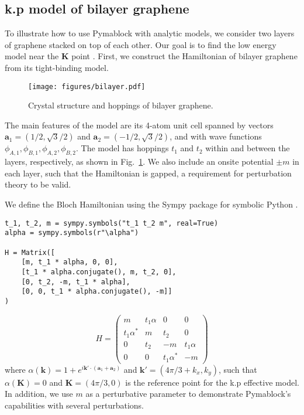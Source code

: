 \subsection{k.p model of bilayer graphene}


To illustrate how to use Pymablock with analytic models, we consider two layers
of graphene stacked on top of each other.
Our goal is to find the low energy model near the $\mathbf{K}$ point
\cite{McCann_2013}.
First, we construct the Hamiltonian of bilayer graphene from its tight-binding
model.
%
\begin{figure}[!htbp]
\centering
\texttt{[image: figures/bilayer.pdf]}
\caption[]{Crystal structure and hoppings of bilayer graphene.}
\label{fig:bilayer}
\end{figure}
%
The main features of the model are its 4-atom unit cell spanned by vectors
$\mathbf{a}_1 = (1/2, \sqrt{3}/2)$ and $\mathbf{a}_2=( -1/2, \sqrt{3}/2)$,
and with wave functions $\phi_{A,1}, \phi_{B,1}, \phi_{A,2}, \phi_{B,2}$.
The model has hoppings $t_1$ and $t_2$ within and between the layers,
respectively, as shown in Fig.~\ref{fig:bilayer}.
We also include an onsite potential $\pm m$ in each layer, such that the
Hamiltonian is gapped, a requirement for perturbation theory to be valid.

We define the Bloch Hamiltonian using the Sympy package for symbolic Python
\cite{Meurer_2017}.
%
\begin{verbatim}
t_1, t_2, m = sympy.symbols("t_1 t_2 m", real=True)
alpha = sympy.symbols(r"\alpha")

H = Matrix([
    [m, t_1 * alpha, 0, 0],
    [t_1 * alpha.conjugate(), m, t_2, 0],
    [0, t_2, -m, t_1 * alpha],
    [0, 0, t_1 * alpha.conjugate(), -m]]
)
\end{verbatim}

$$
H =
\begin{pmatrix}
m & t_1 \alpha & 0 & 0\\
t_1 \alpha^{*} & m & t_2 & 0\\
0 & t_2 & -m & t_1 \alpha\\
0 & 0 & t_1 \alpha^{*} & -m
\end{pmatrix}
$$
%
%
where $\alpha(\mathbf{k}) = 1 + e^{i \mathbf{k'} \cdot (\mathbf{a}_1 +
\mathbf{a}_2)}$ and $\mathbf{k'} = (4\pi/3 + k_x, k_y)$, such that
$\alpha(\mathbf{K}) = 0$ and $\mathbf{K}=(4\pi/3, 0)$ is the reference point
for the k.p effective model.
In addition, we use $m$ as a perturbative parameter to demonstrate Pymablock's
capabilities with several perturbations.

